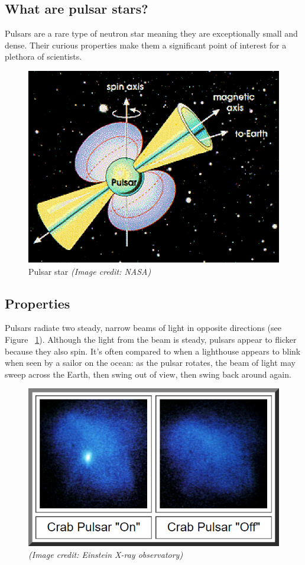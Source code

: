 \documentclass[a4paper,12pt]{article}
\begin{document}
    \subsection{What are pulsar stars?}
    Pulsars are a rare type of neutron star meaning they are exceptionally small and dense. Their curious properties make them a significant point of interest for a plethora of scientists.

    \begin{figure}[ht]
        \centering
        \includegraphics[scale=.85]{pulsar}
        \caption{Pulsar star \textit{(Image credit: NASA)}}
        \label{fig:pulsar}
    \end{figure}

    \newpage

    \subsection{Properties}
    Pulsars radiate two steady, narrow beams of light in opposite directions (see Figure ~\ref{fig:pulsar}). Although the light from the beam is steady, pulsars appear to flicker because they also spin. It’s often compared to when a lighthouse appears to blink when seen by a sailor on the ocean: as the pulsar rotates, the beam of light may sweep across the Earth, then swing out of view, then swing back around again.\cite{pulsarSpace}\par

    \begin{figure}[ht]
        \centering
        \includegraphics[width=.5\textwidth]{pulsar-blink}
        \caption{\textit{(Image credit: Einstein X-ray observatory)}}
        \label{fig:blinkingpulsar}
    \end{figure}
\end{document}
